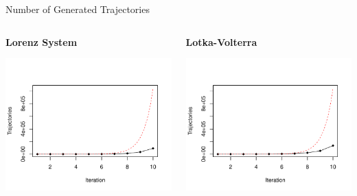 \documentclass[xcolor=svgnames,14pt]{beamer}
\begin{document}
\begin{frame}{Number of Generated Trajectories}%
	\begin{columns}[2]
		\begin{column}{0.5\textwidth}
			\begin{center}
				\textbf{Lorenz System}

				\includegraphics[width=\textwidth]{lorenz84-iterations-summary}
			\end{center}
		\end{column}
		\begin{column}{0.5\textwidth}
			\begin{center}
				\textbf{Lotka-Volterra}

				\includegraphics[width=\textwidth]{lotkav-iterations-summary}
			\end{center}
		\end{column}
	\end{columns}
\end{frame}%
\end{document}
